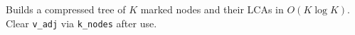 
Builds a compressed tree of $K$ marked nodes and their LCAs in $O(K \log K)$. Clear \lstinline|v_adj| via \lstinline|k_nodes| after use.


